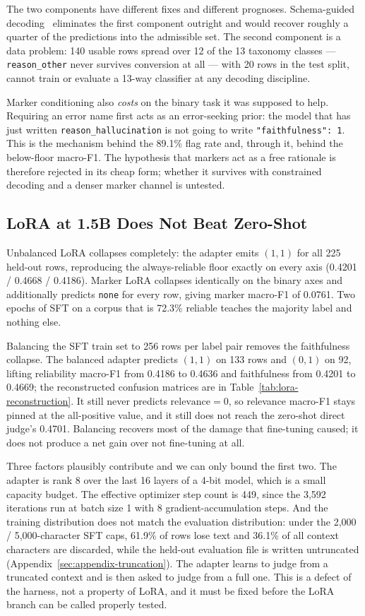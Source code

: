 \documentclass{zapiski}
\begin{document}
The two components have different fixes and different prognoses. Schema-guided
decoding~\cite{willard2023efficient} eliminates the first component outright
and would recover roughly a quarter of the predictions into the admissible
set. The second component is a data problem: 140 usable rows spread over 12 of the 13 taxonomy
classes --- \texttt{reason\_other} never survives conversion at all --- with
20 rows in the test split, cannot train or evaluate a 13-way classifier at any
decoding discipline.

Marker conditioning also \emph{costs} on the binary task it was supposed to
help. Requiring an error name first acts as an error-seeking prior: the model
that has just written \texttt{reason\_hallucination} is not going to write
\texttt{"faithfulness": 1}. This is the mechanism behind the 89.1\% flag rate
and, through it, behind the below-floor macro-F1. The hypothesis that markers
act as a free rationale is therefore rejected in its cheap form; whether it
survives with constrained decoding and a denser marker channel is untested.

\subsection{LoRA at 1.5B Does Not Beat Zero-Shot}
\label{sec:results-lora}

Unbalanced LoRA collapses completely: the adapter emits $(1,1)$ for all 225
held-out rows, reproducing the always-reliable floor exactly on every axis
(0.4201 / 0.4668 / 0.4186). Marker LoRA collapses identically on the binary
axes and additionally predicts \texttt{none} for every row, giving marker
macro-F1 of 0.0761. Two epochs of SFT on a corpus that is 72.3\% reliable
teaches the majority label and nothing else.

Balancing the SFT train set to 256 rows per label pair removes the
faithfulness collapse. The balanced adapter predicts $(1,1)$ on 133 rows and
$(0,1)$ on 92, lifting reliability macro-F1 from 0.4186 to 0.4636 and
faithfulness from 0.4201 to 0.4669; the reconstructed confusion matrices are
in Table~\ref{tab:lora-reconstruction}. It still never predicts
$\mathrm{relevance}=0$, so relevance macro-F1 stays pinned at the
all-positive value, and it still does not reach the zero-shot direct judge's
0.4701. Balancing recovers most of the damage that fine-tuning caused; it does
not produce a net gain over not fine-tuning at all.

Three factors plausibly contribute and we can only bound the first two. The
adapter is rank 8 over the last 16 layers of a 4-bit model, which is a small
capacity budget. The effective optimizer step count is 449, since the 3,592
iterations run at batch size 1 with 8 gradient-accumulation steps. And the
training distribution does not match the evaluation distribution: under the
2,000 / 5,000-character SFT caps, 61.9\% of rows lose text and 36.1\% of all
context characters are discarded, while the held-out evaluation file is
written untruncated (Appendix~\ref{sec:appendix-truncation}). The adapter
learns to judge from a truncated context and is then asked to judge from a
full one. This is a defect of the harness, not a property of LoRA, and it must
be fixed before the LoRA branch can be called properly tested.
\end{document}
